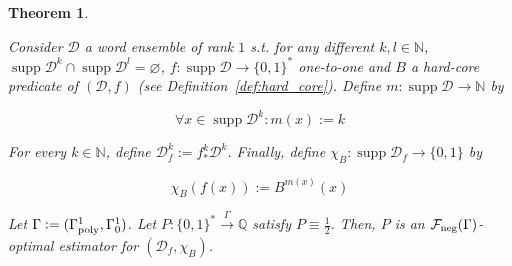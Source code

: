 \documentclass[11pt]{article}
\numberwithin{equation}{section}
\theoremstyle{definition}
\theoremstyle{plain}
\newtheorem{theorem}{Theorem}[section]
\newcommand{\Bool}{\{0,1\}}
\newcommand{\Words}{{\Bool^*}}
\DeclareMathOperator{\Supp}{supp}
\newcommand{\Nats}{\mathbb{N}}
\newcommand{\Rats}{\mathbb{Q}}
\newcommand{\Dist}{\mathcal{D}}
\newcommand{\Fall}{\mathcal{F}}
\newcommand{\GammaPoly}{\Gamma_{\textnormal{poly}}}
\newcommand{\Scheme}{\xrightarrow{\Gamma}}
\begin{document}
\begin{theorem}
\label{thm:hard_core}

Consider $\Dist$ a word ensemble of rank ${1}$ s.t. for any different $k,l \in \Nats$,\\ ${\Supp \Dist^k \cap \Supp \Dist^l = \varnothing}$, ${f: \Supp \Dist \rightarrow \Words}$ one-to-one and $B$ a hard-core predicate of $(\Dist,f)$ (see Definition~\ref{def:hard_core}). Define ${m: \Supp \Dist \rightarrow \Nats}$ by 

\[\forall x \in \Supp \Dist^k: m(x):=k\]

For every $k \in \Nats$, define ${\Dist_f^k:=f_*^k\Dist^k}$.  Finally, define ${\chi_B: \Supp \Dist_f \rightarrow \Bool}$ by

\[\chi_B(f(x)):=B^{m(x)}(x)\]

Let $\Gamma:=(\GammaPoly^1,\Gamma_0^1)$. Let $P: \Words \Scheme \Rats$ satisfy $P \equiv \frac{1}{2}$. Then, $P$ is an $\Fall_{\textnormal{neg}}(\Gamma)$-optimal estimator for $(\Dist_f, \chi_B)$.

\end{theorem}
\end{document}
